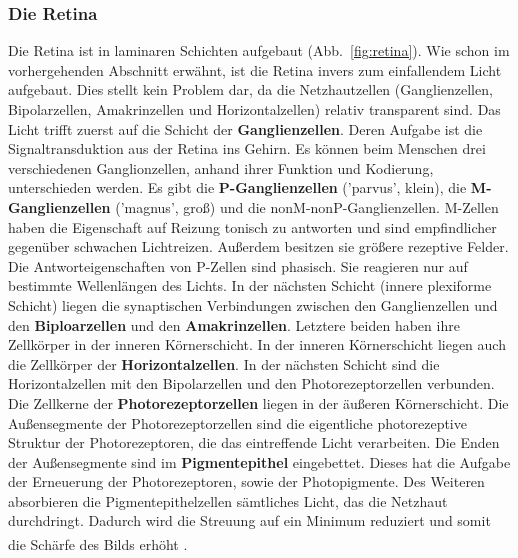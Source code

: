 \documentclass[12pt,a4paper,pdftex]{article}
\begin{document}
\subsubsection*{Die Retina}


Die Retina ist in laminaren Schichten aufgebaut (Abb.~\ref{fig:retina}).
Wie schon im vorhergehenden Abschnitt erwähnt, ist die Retina invers zum einfallendem Licht aufgebaut. Dies stellt kein Problem dar, da die Netzhautzellen (Ganglienzellen, Bipolarzellen, Amakrinzellen und Horizontalzellen) relativ transparent sind. Das Licht trifft zuerst auf die Schicht der \textbf{Ganglienzellen}.  Deren Aufgabe ist die Signaltransduktion aus der Retina ins Gehirn. Es können beim Menschen drei verschiedenen Ganglionzellen, anhand ihrer Funktion und Kodierung, unterschieden werden. Es gibt die \textbf{P-Ganglienzellen}  ('parvus', klein), die \textbf{M-Ganglienzellen}  ('magnus', groß) und die nonM-nonP-Ganglienzellen. 
M-Zellen haben die Eigenschaft auf Reizung tonisch zu antworten und sind empfindlicher gegenüber schwachen Lichtreizen. Außerdem besitzen sie größere rezeptive Felder. Die Antworteigenschaften von P-Zellen sind phasisch. Sie reagieren nur auf bestimmte Wellenlängen des Lichts. In der nächsten Schicht (innere plexiforme Schicht) liegen die synaptischen Verbindungen zwischen den Ganglienzellen und den \textbf{Biploarzellen}  und den \textbf{Amakrinzellen}.  Letztere beiden haben ihre Zellkörper in der inneren Körnerschicht. In der inneren Körnerschicht liegen auch die Zellkörper der \textbf{Horizontalzellen}.  In der nächsten Schicht sind die Horizontalzellen mit den Bipolarzellen und den Photorezeptorzellen verbunden. Die Zellkerne der \textbf{Photorezeptorzellen}  liegen in der äußeren Körnerschicht. Die Außensegmente der Photorezeptorzellen sind die eigentliche photorezeptive Struktur der Photorezeptoren, die das eintreffende Licht verarbeiten. Die Enden der Außensegmente sind im \textbf{Pigmentepithel}  eingebettet. Dieses hat die Aufgabe der Erneuerung der Photorezeptoren, sowie der Photopigmente. Des Weiteren absorbieren die Pigmentepithelzellen sämtliches Licht, das die Netzhaut durchdringt. Dadurch wird die Streuung auf ein Minimum reduziert und somit die Schärfe des Bilds erhöht \textsuperscript{\cite[10]{neurowissenschaften_baer}}.
\\
\end{document}
